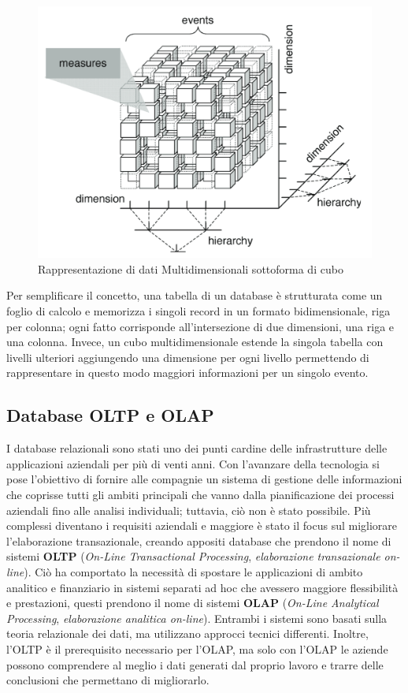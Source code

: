 \begin{figure}
    \centering
    \includegraphics[width=0.85\linewidth]{figure/capitolo_2/Multidimensional Data Cube.pdf}
    \caption{Rappresentazione di dati Multidimensionali sottoforma di cubo}
    \label{fig:Multidimensional Data Cube}
\end{figure}

Per semplificare il concetto, una tabella di un database è strutturata come un foglio di calcolo e memorizza i singoli record in un formato bidimensionale, riga per colonna; ogni fatto corrisponde all'intersezione di due dimensioni, una riga e una colonna. Invece, un cubo multidimensionale estende la singola tabella con livelli ulteriori aggiungendo una dimensione per ogni livello permettendo di rappresentare in questo modo maggiori informazioni per un singolo evento.\cite{ibm_multidimensional_data}

\subsection{Database OLTP e OLAP}

I database relazionali sono stati uno dei punti cardine delle infrastrutture delle applicazioni aziendali per più di venti anni. Con l'avanzare della tecnologia si pose l'obiettivo di fornire alle compagnie un sistema di gestione delle informazioni che coprisse tutti gli ambiti principali che vanno dalla pianificazione dei processi aziendali fino alle analisi individuali; tuttavia, ciò non è stato possibile. Più complessi diventano i requisiti aziendali e maggiore è stato il focus sul migliorare l'elaborazione transazionale, creando appositi database che prendono il nome di sistemi \textbf{OLTP} (\textit{On-Line Transactional Processing}, \textit{elaborazione transazionale on-line}). Ciò ha comportato la necessità di spostare le applicazioni di ambito analitico e finanziario in sistemi separati ad hoc che avessero maggiore flessibilità e prestazioni, questi prendono il nome di sistemi \textbf{OLAP} (\textit{On-Line Analytical Processing}, \textit{elaborazione analitica on-line}). Entrambi i sistemi sono basati sulla teoria relazionale dei dati, ma utilizzano approcci tecnici differenti. Inoltre, l'OLTP è il prerequisito necessario per l'OLAP, ma solo con l'OLAP le aziende possono comprendere al meglio i dati generati dal proprio lavoro e trarre delle conclusioni che permettano di migliorarlo.\cite{scribd_oltp_olap}

